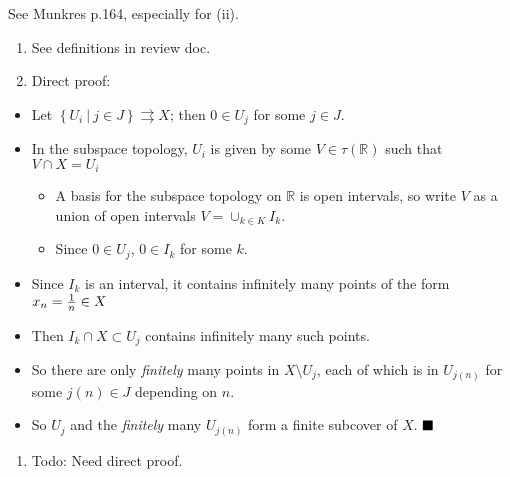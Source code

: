 \begin{solution}

\envlist

\begin{concept}

See Munkres p.164, especially for (ii).

\end{concept}

\begin{enumerate}
\def\labelenumi{\alph{enumi}.}
\item
  See definitions in review doc.
\item
  Direct proof:
\end{enumerate}

\begin{itemize}
\tightlist
\item
  Let
  \(\left\{{U_i {~\mathrel{\Big|}~}j\in J}\right\}\rightrightarrows X\);
  then \(0\in U_j\) for some \(j\in J\).
\item
  In the subspace topology, \(U_i\) is given by some
  \(V\in \tau({\mathbb{R}})\) such that \(V\cap X = U_i\)

  \begin{itemize}
  \tightlist
  \item
    A basis for the subspace topology on \({\mathbb{R}}\) is open
    intervals, so write \(V\) as a union of open intervals
    \(V = \cup_{k\in K} I_k\).
  \item
    Since \(0\in U_j\), \(0\in I_k\) for some \(k\).
  \end{itemize}
\item
  Since \(I_k\) is an interval, it contains infinitely many points of
  the form \(x_n = {1 \over n} \in X\)
\item
  Then \(I_k \cap X \subset U_j\) contains infinitely many such points.
\item
  So there are only \emph{finitely} many points in \(X\setminus U_j\),
  each of which is in \(U_{j(n)}\) for some \(j(n) \in J\) depending on
  \(n\).
\item
  So \(U_j\) and the \emph{finitely} many \(U_{j(n)}\) form a finite
  subcover of \(X\). \(\hfill\blacksquare\)
\end{itemize}

\begin{enumerate}
\def\labelenumi{\alph{enumi}.}
\setcounter{enumi}{2}
\tightlist
\item
  Todo: Need direct proof.
\end{enumerate}

\end{solution}

